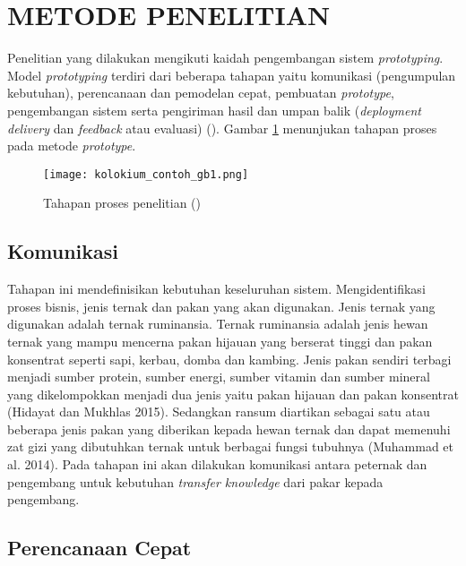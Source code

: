 \section*{METODE PENELITIAN}

Penelitian yang dilakukan mengikuti kaidah pengembangan sistem \textit{prototyping}. Model \textit{prototyping} terdiri dari beberapa tahapan yaitu komunikasi (pengumpulan kebutuhan), perencanaan dan pemodelan cepat, pembuatan \textit{prototype}, pengembangan sistem serta pengiriman hasil dan umpan balik (\textit{deployment delivery} dan \textit{feedback} atau evaluasi) (\cite{Pressman2010}). Gambar \ref{fig:tahapan} menunjukan tahapan proses pada metode \textit{prototype}.

\begin{figure}[h!] %
\centering
\texttt{[image: kolokium\_contoh\_gb1.png]}
\caption{Tahapan proses penelitian (\cite{Pressman2010})}
\label{fig:tahapan}
\end{figure}

\subsection*{Komunikasi}

Tahapan ini mendefinisikan kebutuhan keseluruhan sistem. Mengidentifikasi proses bisnis, jenis ternak dan pakan yang akan digunakan. Jenis ternak yang digunakan adalah ternak ruminansia. Ternak ruminansia adalah jenis hewan ternak yang mampu mencerna pakan hijauan yang berserat tinggi dan pakan konsentrat seperti sapi, kerbau, domba dan kambing. Jenis pakan sendiri terbagi menjadi sumber protein, sumber energi, sumber vitamin dan sumber mineral yang dikelompokkan menjadi dua jenis yaitu pakan hijauan dan pakan konsentrat (Hidayat dan Mukhlas 2015). Sedangkan ransum diartikan sebagai satu atau beberapa jenis pakan yang diberikan kepada hewan ternak dan dapat memenuhi zat gizi yang dibutuhkan ternak untuk berbagai fungsi tubuhnya (Muhammad et al. 2014). Pada tahapan ini akan dilakukan komunikasi antara peternak dan pengembang untuk kebutuhan \textit{transfer knowledge} dari pakar kepada pengembang.

\subsection*{Perencanaan Cepat}

